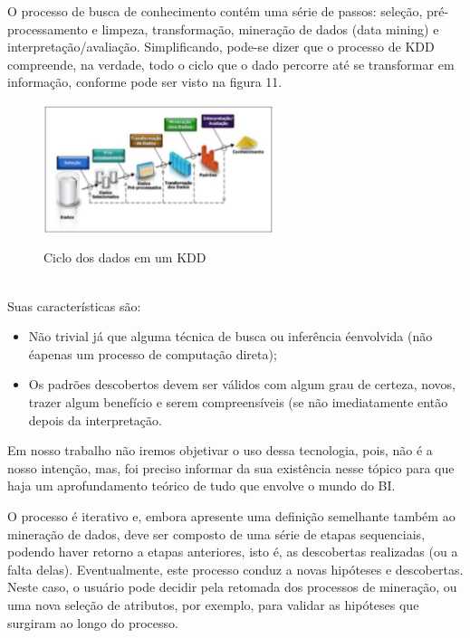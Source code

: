 O processo de busca de conhecimento cont\'{e}m uma s\'{e}rie de passos: sele\c{c}\~{a}o, pr\'{e}-processamento e limpeza, transforma\c{c}\~{a}o, minera\c{c}\~{a}o de dados (data mining) e interpreta\c{c}\~{a}o/avalia\c{c}\~{a}o. 
Simplificando, pode-se dizer que o processo de KDD compreende, na verdade, todo o ciclo que o dado percorre at\'{e} se transformar em informa\c{c}\~{a}o, conforme pode ser visto na figura 11.

\begin{figure}[H]
	\vspace*{0,2cm}
    \centering
    \caption{Ciclo dos dados em um KDD}
    \includegraphics[width=0.6\textwidth]{./04-figuras/figura-11}
    \label{fig:ilustfig11}
\end{figure}
\vspace*{-0,9cm}
{\raggedright {}} \\

Suas características s\~{a}o:

\begin{itemize}

    \item Não trivial já que alguma técnica de busca ou inferência \'{e}envolvida (não \'{e}apenas um processo de computação direta);
    
    \item Os padrões descobertos devem ser válidos com algum grau de certeza, novos, trazer algum benefício e serem compreensíveis (se não imediatamente então depois da interpreta\c{c}\~{a}o.

\end{itemize}

Em nosso trabalho n\~{a}o iremos objetivar o uso dessa tecnologia, pois, n\~{a}o \'{e} a nosso inten\c{c}\~{a}o, mas, foi preciso informar da sua existência nesse tópico para que haja um aprofundamento teórico de tudo que envolve o mundo do BI. 

O processo \'{e} iterativo e, embora apresente uma defini\c{c}\~{a}o semelhante tamb\'{e}m ao minera\c{c}\~{a}o de dados, deve ser composto de uma s\'{e}rie de etapas sequenciais, podendo haver retorno a etapas anteriores, isto \'{e}, as descobertas realizadas (ou a falta delas). Eventualmente, este processo conduz a novas hipóteses e descobertas. Neste caso, o usu\'{a}rio pode decidir pela retomada dos processos de minera\c{c}\~{a}o, ou uma nova sele\c{c}\~{a}o de atributos, por exemplo, para validar as hipóteses que surgiram ao longo do processo.

